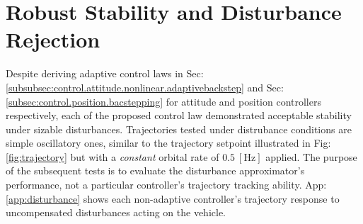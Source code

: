 \section{Robust Stability and Disturbance Rejection}
\label{sec:simulation.disturbance}
Despite deriving adaptive control laws in Sec:\ref{subsubsec:control.attitude.nonlinear.adaptivebackstep} and Sec:\ref{subsec:control.position.bacstepping} for attitude and position controllers respectively, each of the proposed control law demonstrated acceptable stability under sizable disturbances. Trajectories tested under distrubance conditions are simple oscillatory ones, similar to the trajectory setpoint illustrated in Fig:\ref{fig:trajectory} but with a \emph{constant} orbital rate of $0.5~[\text{Hz}]$ applied. The purpose of the subsequent tests is to evaluate the disturbance approximator's performance, not a particular controller's trajectory tracking ability. App:\ref{app:disturbance} shows each non-adaptive controller's trajectory response to uncompensated disturbances acting on the vehicle.
